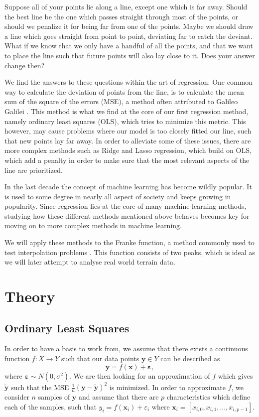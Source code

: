 \documentclass{article}
\begin{document}
Suppose all of your points lie along a line, except one which is far away. Should the best line be the one which passes straight through most of the points, or should we penalize it for being far from one of the points. Maybe we should draw a line which goes straight from point to point, deviating far to catch the deviant. What if we know that we only have a handful of all the points, and that we want to place the line such that future points will also lay close to it. Does your answer change then?

We find the answers to these questions within the art of regression. One common way to calculate the deviation of points from the line, is to calculate the mean sum of the square of the errors (MSE), a method often attributed to Galileo Galilei \cite{galileo}. This method is what we find at the core of our first regression method, namely ordinary least squares (OLS), which tries to minimize this metric. This however, may cause problems where our model is too closely fitted our line, such that new points lay far away. In order to alleviate some of these issues, there are more complex methods such as Ridge and Lasso regression, which build on OLS, which add a penalty in order to make sure that the most relevant aspects of the line are prioritized.

In the last decade the concept of machine learning has become wildly popular. It is used to some degree in nearly all aspect of society and keeps growing in popularity. Since regression lies at the core of many machine learning methods, studying how these different methods mentioned above behaves becomes key for moving on to more complex methods in machine learning.

We will apply these methods to the Franke function, a method commonly used to test interpolation problems \cite{Franke:1982}. This function consists of two peaks, which is ideal as we will later attempt to analyse real world terrain data.

\newpage
\section{Theory}
\subsection{Ordinary Least Squares}
In order to have a basis to work from, we assume that there exists a continuous function $f: X \to Y$ such that our data points $\boldsymbol{y} \in Y$ can be described as
\begin{equation*}
    \boldsymbol{y} = f(\boldsymbol{x}) + \boldsymbol{\varepsilon},
\end{equation*}
where $\boldsymbol{\varepsilon} \sim N(0, \sigma^2)$. We are then looking for an approximation of $f$ which gives $\tilde{\boldsymbol{y}}$ such that the MSE $\frac{1}{n} \left( \boldsymbol{y} - \tilde{\boldsymbol{y}} \right)^2$ is minimized. In order to approximate $f$, we consider $n$ samples of $\boldsymbol{y}$ and assume that there are $p$ characteristics which define each of the samples, such that $y_i = f(\boldsymbol{x}_i) + \varepsilon_i$ where $\boldsymbol{x}_i = \left[x_{i,0}, x_{i, 1}, \ldots, x_{i, p-1} \right]$.
\end{document}
